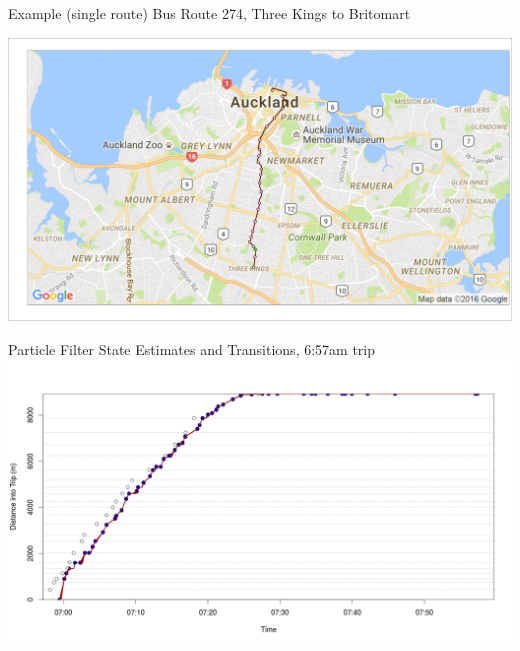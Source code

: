 \documentclass[10pt,t]{beamer}
\begin{document}
\begin{frame}{Example (single route)}
  Bus Route 274, Three Kings to Britomart

  \begin{overprint}
    \centering
    \includegraphics[width=1\textwidth,trim={2mm 2mm 2mm 2mm},clip]{figs/r274/TRIP5_particle_map001.png}

    \vspace{2em}
    Particle Filter State Estimates and Transitions, 6:57am trip
    \centering
    \includegraphics[width=1\textwidth]{figs/r274/TRIP5_distance_traveled.png}


\end{overprint}
\end{frame}
\end{document}
